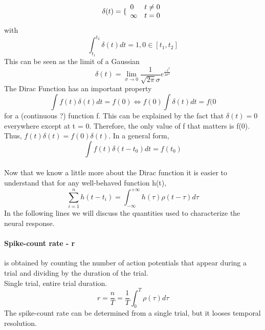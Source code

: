 \documentclass{report}
\begin{document}
\begin{equation}
\delta(t) = \{
\begin{array}{ll}
0 & t\neq 0\\
\infty  & t = 0\\
\end{array}
\\
\end{equation}
with
\begin{equation}
\int_{t_{1}}^{t_{2}} \delta(t) dt = 1, 0 \in [t_{1}, t_{2}]
\end{equation}
This can be seen as the limit of a Gaussian
\begin{equation}
\delta(t) = \lim_{\sigma\to0} \frac{1}{\sqrt{2\pi}\sigma}e^{\frac{-t^{2}}{2\sigma^{2}}}
\end{equation}
The Dirac Function has an important property
\begin{equation}
\int f(t)\delta(t) dt = f(0)\iff f(0)\int\delta(t) dt = f(0
\end{equation}
for a (continuous ?) function f. This can be explained by the fact that $\delta(t) = 0$ everywhere except at t = 0. Therefore, the only value of f that matters is f(0). Thus, $f(t)\delta(t) = f(0)\delta(t)$.
In a general form, 
\begin{equation}
\int f(t)\delta(t-t_{0}) dt = f(t_{0})
\end{equation}
\\Now that we know a little more about the Dirac function it is easier to understand that for any well-behaved function h(t),
\begin{equation}
\sum_{i=1}^{n} h(t-t_{i}) = \int_{-\infty}^{+\infty} h(\tau)\rho(t-\tau) d\tau
\end{equation}
In the following lines we will discuss the quantities used to characterize the neural response.
\paragraph{Spike-count rate - r}
is obtained by counting the number of action potentials that appear during a trial and dividing by the duration of the trial. 
\\Single trial, entire trial duration.
\begin{equation}
r = \frac{n}{T}=\frac{1}{T}\int_{0}^{T}\rho(\tau) d\tau
\end{equation}
The spike-count rate can be determined from a single trial, but it looses temporal resolution.
\end{document}

